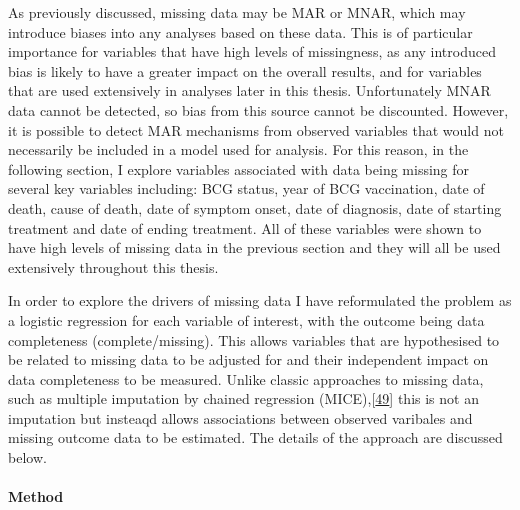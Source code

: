 \documentclass[11pt,twoside]{bristolthesis}
\begin{document}
  As previously discussed, missing data may be MAR or MNAR, which may introduce biases into any analyses based on these data. This is of particular importance for variables that have high levels of missingness, as any introduced bias is likely to have a greater impact on the overall results, and for variables that are used extensively in analyses later in this thesis. Unfortunately MNAR data cannot be detected, so bias from this source cannot be discounted. However, it is possible to detect MAR mechanisms from observed variables that would not necessarily be included in a model used for analysis. For this reason, in the following section, I explore variables associated with data being missing for several key variables including: BCG status, year of BCG vaccination, date of death, cause of death, date of symptom onset, date of diagnosis, date of starting treatment and date of ending treatment. All of these variables were shown to have high levels of missing data in the previous section and they will all be used extensively throughout this thesis.
  
  In order to explore the drivers of missing data I have reformulated the problem as a logistic regression for each variable of interest, with the outcome being data completeness (complete/missing). This allows variables that are hypothesised to be related to missing data to be adjusted for and their independent impact on data completeness to be measured. Unlike classic approaches to missing data, such as multiple imputation by chained regression (MICE),{[}\protect\hyperlink{ref-Groothuis-oudshoorn}{49}{]} this is not an imputation but insteaqd allows associations between observed varibales and missing outcome data to be estimated. The details of the approach are discussed below.
  
  \hypertarget{method}{%
  \paragraph{Method}\label{method}}
  
\end{document}
